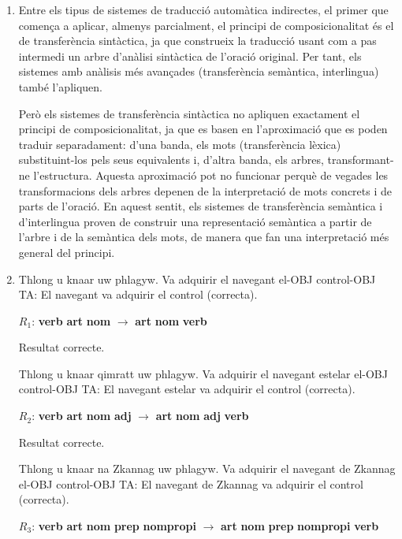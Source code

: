 \begin{enumerate}
\item Entre els tipus de sistemes de traducció automàtica indirectes,
  el primer que comença a aplicar, almenys parcialment, el principi de
  composicionalitat és el de transferència sintàctica, ja que
  construeix la traducció usant com a pas intermedi un arbre d'anàlisi
  sintàctica de l'oració original. Per tant, els sistemes amb anàlisis
  més avançades (transferència semàntica, interlingua) també
  l'apliquen.

  Però els sistemes de transferència sintàctica no apliquen exactament
  el principi de composicionalitat, ja que es basen en l'aproximació
  que es poden traduir separadament: d'una banda, els mots
  (transferència lèxica) substituint-los pels seus equivalents i,
  d'altra banda, els arbres, transformant-ne l'estructura. Aquesta
  aproximació pot no funcionar perquè de vegades les transformacions
  dels arbres depenen de la interpretació de mots concrets i de parts
  de l'oració. En aquest sentit, els sistemes de transferència
  semàntica i d'interlingua proven de construir una representació
  semàntica a partir de l'arbre i de la semàntica dels mots, de manera
  que fan una interpretació més general del principi.

\item

     \begin{example}
     \gll Thlong u knaar uw phlagyw.
          {Va adquirir} el navegant el-OBJ control-OBJ
     \glt TA: El navegant va adquirir el control (correcta).
     \glend
     \end{example}
     $R_1$: \textbf{verb} \textbf{art} \textbf{nom} $\rightarrow$
     \textbf{art} \textbf{nom} \textbf{verb}

     Resultat correcte.

     \begin{example}
     \gll Thlong u knaar qimratt uw phlagyw.
          {Va adquirir} el navegant estelar el-OBJ control-OBJ
     \glt TA: El navegant estelar va adquirir el control (correcta).
     \glend
     \end{example}
     $R_2$: \textbf{verb} \textbf{art} \textbf{nom} \textbf{adj} $\rightarrow$
     \textbf{art} \textbf{nom} \textbf{adj} \textbf{verb} 
     \begin{example}
 
     Resultat correcte.

     \gll Thlong u knaar na Zkannag uw phlagyw.
          {Va adquirir} el navegant de Zkannag el-OBJ control-OBJ
     \glt TA: El navegant de Zkannag va adquirir el control (correcta).
     \glend
     \end{example}
     $R_3$: \textbf{verb} \textbf{art} \textbf{nom} \textbf{prep}
     \textbf{nompropi} $\rightarrow$ \textbf{art} \textbf{nom}
     \textbf{prep} \textbf{nompropi} \textbf{verb}


\end{enumerate}
